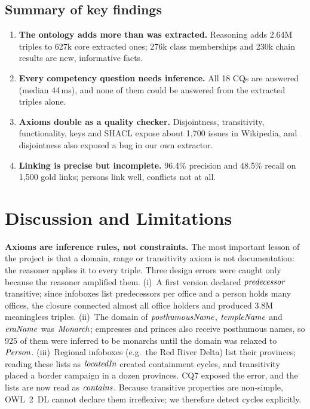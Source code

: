 \documentclass{article}
\newcommand{\cls}[1]{\ensuremath{\text{\textit{#1}}}}  %
\begin{document}
\subsection{Summary of key findings}

\begin{enumerate}[leftmargin=*,itemsep=2pt]
  \item \textbf{The ontology adds more than was extracted.} Reasoning adds 2.64M triples to 627k core extracted ones;
        276k class memberships and 230k chain results are new, informative facts.
  \item \textbf{Every competency question needs inference.} All 18 CQs are answered (median 44\,ms), and none of them
        could be answered from the extracted triples alone.
  \item \textbf{Axioms double as a quality checker.} Disjointness, transitivity, functionality, keys and SHACL expose
        about 1{,}700 issues in Wikipedia, and disjointness also exposed a bug in our own extractor.
  \item \textbf{Linking is precise but incomplete.} 96.4\% precision and 48.5\% recall on 1{,}500 gold links; persons
        link well, conflicts not at all.
\end{enumerate}

\section{Discussion and Limitations}\label{sec:disc}

\textbf{Axioms are inference rules, not constraints.} The most important lesson of the project is that a domain,
range or transitivity axiom is not documentation: the reasoner applies it to every triple. Three design errors were
caught only because the reasoner amplified them. (i)~A first version declared \cls{predecessor} transitive; since
infoboxes list predecessors per office and a person holds many offices, the closure connected almost all office
holders and produced 3.8M meaningless triples. (ii)~The domain of \cls{posthumousName}, \cls{templeName} and
\cls{eraName} was \cls{Monarch}; empresses and princes also receive posthumous names, so 925 of them were inferred to be
monarchs until the domain was relaxed to \cls{Person}. (iii)~Regional infoboxes (e.g.\ the Red River Delta) list their
provinces; reading these lists as \cls{locatedIn} created containment cycles, and transitivity placed a border campaign
in a dozen provinces. CQ7 exposed the error, and the lists are now read as \cls{contains}. Because transitive properties are non-simple, OWL~2~DL cannot
declare them irreflexive; we therefore detect cycles explicitly.
\end{document}
